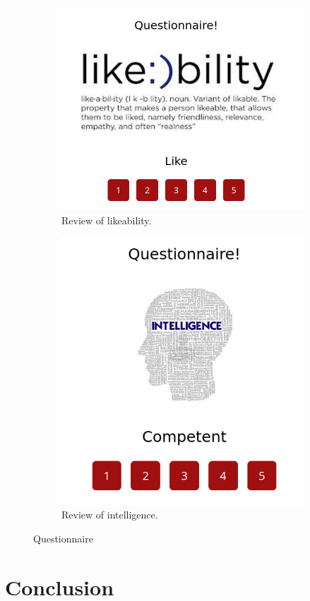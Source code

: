 \documentclass[12pt, letterpaper, twoside]{article}
\begin{document}
\begin{figure}[h]
	\centering
	\begin{subfigure}{.5\textwidth}
	  \centering
	  \includegraphics[width=.85\linewidth]{img/likeability.png}
	  \caption{Review of likeability.}
	  \label{fig:likeability}
	\end{subfigure}%
	\begin{subfigure}{.5\textwidth}
	  \centering
	  \includegraphics[width=.6\linewidth]{img/intelligence.png}
	  \caption{Review of intelligence.}
	  \label{fig:intelligence}
	\end{subfigure}
	\caption{Questionnaire}
	\label{fig:questionnaire}
\end{figure}


\newpage
\section{Conclusion}
\end{document}
